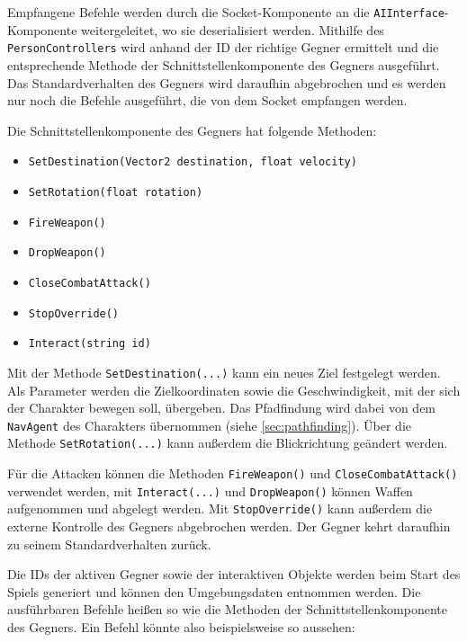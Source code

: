 Empfangene Befehle werden durch die Socket-Komponente an die \texttt{AIInterface}-Komponente weitergeleitet, wo sie deserialisiert werden. Mithilfe des \texttt{PersonControllers} wird anhand der ID der richtige Gegner ermittelt und die entsprechende Methode der Schnittstellenkomponente des Gegners ausgeführt. Das Standardverhalten des Gegners wird daraufhin abgebrochen und es werden nur noch die Befehle ausgeführt, die von dem Socket empfangen werden.

Die Schnittstellenkomponente des Gegners hat folgende Methoden:

\begin{itemize}
	\item \texttt{SetDestination(Vector2 destination, float velocity)}
	\item \texttt{SetRotation(float rotation)}
	\item \texttt{FireWeapon()}
	\item \texttt{DropWeapon()}
	\item \texttt{CloseCombatAttack()}
	\item \texttt{StopOverride()}
	\item \texttt{Interact(string id)}
\end{itemize}

Mit der Methode \texttt{SetDestination(...)} kann ein neues Ziel festgelegt werden. Als Parameter werden die Zielkoordinaten sowie die Geschwindigkeit, mit der sich der Charakter bewegen soll, übergeben. Das Pfadfindung wird dabei von dem \texttt{NavAgent} des Charakters übernommen (siehe \ref{sec:pathfinding}). Über die Methode \texttt{SetRotation(...)} kann außerdem die Blickrichtung geändert werden.

Für die Attacken können die Methoden \texttt{FireWeapon()} und \texttt{CloseCombatAttack()} verwendet werden, mit \texttt{Interact(...)} und \texttt{DropWeapon()} können Waffen aufgenommen und abgelegt werden. Mit \texttt{StopOverride()} kann außerdem die externe Kontrolle des Gegners abgebrochen werden. Der Gegner kehrt daraufhin zu seinem Standardverhalten zurück.

Die IDs der aktiven Gegner sowie der interaktiven Objekte werden beim Start des Spiels generiert und können den Umgebungsdaten entnommen werden. Die ausführbaren Befehle heißen so wie die Methoden der Schnittstellenkomponente des Gegners. Ein Befehl könnte also beispielsweise so aussehen:

\texttt{
}

